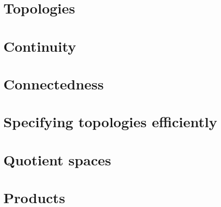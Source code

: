 \documentclass[a4paper,nobib,nols]{tufte-book}
\begin{document}
\section{Topologies}%
\label{sec:topologies}



\section{Continuity}%
\label{sec:continuity}



\section{Connectedness}%
\label{sec:connectedness}

\section{Specifying topologies efficiently}%
\label{sec:specifying_topologies_efficiently}



\section{Quotient spaces}%
\label{sec:quotient_spaces}



\section{Products}%
\label{sec:products}
\end{document}
